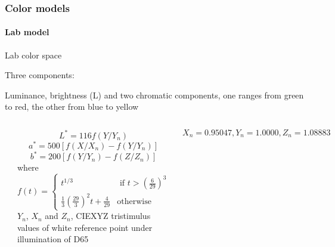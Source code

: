 \documentclass{beamer}
\begin{document}
\begin{frame}
\frametitle{Color models}
\framesubtitle{Lab model}
\begin{block}{Lab color space}
\begin{itemize}
\footnotesize{
\item Three components:
\item Luminance, brightness (L) and two chromatic components, one ranges from green to red, the other from blue to yellow
}
\end{itemize}
\begin{columns}
\begin{center}
\includegraphics[scale=0.9]{images/L6_lab.jpg}
\end{center}
\tiny{
$$ L^{\ast} = 116 f(Y/Y_{n})$$
$$a^{\ast} = 500[f(X/X_{n}) - f(Y/Y_{n})]$$
$$b^{\ast} = 200[f(Y/Y_{n}) - f(Z/Z_{n})]$$
where 
$$ f(t) = \begin{cases}
t^{1/3} & \text{   if  } t > (\frac{6}{29})^{3} \\
\frac{1}{3} (\frac{29}{3})^{2} t + \frac{4}{29} & \text{otherwise}
\end{cases}$$ 
$Y_{n}$, $X_{n}$ and $Z_{n}$, CIEXYZ tristimulus values of white reference point under illumination of D65

$$X_{n} = 0.95047, Y_{n} =1.0000 , Z_{n} = 1.08883 $$ 
}
\end{columns}
\end{block}
\end{frame}
\end{document}
